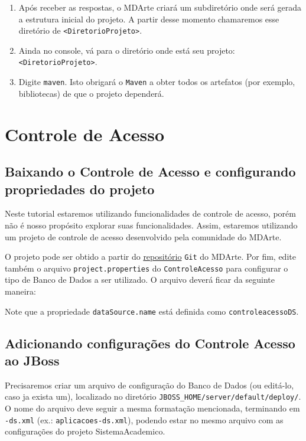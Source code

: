 \begin{enumerate}
\item Após receber as respostas, o MDArte criará um subdiretório onde será
gerada a estrutura inicial do projeto. A partir desse momento chamaremos esse
diretório de \texttt{<DiretorioProjeto>}.

\item Ainda no console, vá para o diretório onde está seu projeto:
\texttt{<DiretorioProjeto>}.

\item Digite \texttt{maven}. Isto obrigará o \texttt{Maven} a obter todos os
artefatos (por exemplo, bibliotecas) de que o projeto dependerá.

\end{enumerate}

\section{Controle de Acesso}

\subsection{Baixando o Controle de Acesso e configurando propriedades do
projeto}
Neste tutorial estaremos utilizando funcionalidades de controle de acesso, porém
não é nosso propósito explorar suas funcionalidades. Assim, estaremos utilizando
um projeto de controle de acesso desenvolvido pela comunidade do MDArte.

O projeto pode ser obtido a partir do
\href{https://github.com/MDArte/controleacesso.git}{repositório} \texttt{Git} do
MDArte. Por fim, edite também o arquivo \texttt{project.properties} do
\texttt{ControleAcesso} para configurar o tipo de Banco de Dados a ser
utilizado. O arquivo deverá ficar da seguinte maneira:

\begin{framed}
	
\end{framed}

Note que a propriedade \texttt{dataSource.name} está definida como
\texttt{controleacessoDS}.

\subsection{Adicionando configurações do Controle Acesso ao JBoss}

Precisaremos criar um arquivo de configuração do Banco de Dados (ou editá-lo,
caso ja exista um), localizado no diretório
\texttt{\textdollar{}JBOSS\_HOME/server/default/deploy/}. O nome do arquivo deve
seguir a mesma formatação mencionada, terminando em \texttt{-ds.xml} (ex.:
\texttt{aplicacoes-ds.xml}), podendo estar no mesmo arquivo com as configurações
do projeto SistemaAcademico.

